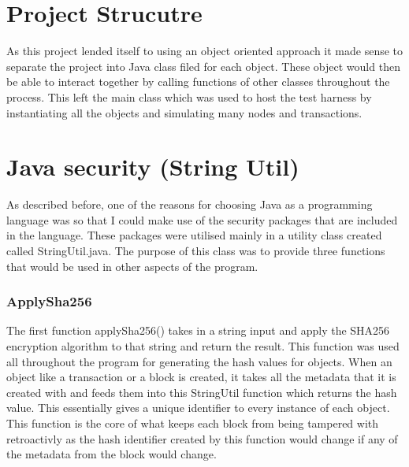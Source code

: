 \documentclass{l4proj}
\begin{document}
\section{Project Strucutre}
As this project lended itself to using an object oriented approach it made sense to separate the project into
Java class filed for each object. These object would then be able to interact together by calling functions
of other classes throughout the process. This left the main class which was used to host the test harness by
instantiating all the objects and simulating many nodes and transactions.


\section{Java security (String Util)}
As described before, one of the reasons for choosing Java as a programming language was so that I could make use
of the security packages that are included in the language. These packages were utilised mainly in a utility class created
called StringUtil.java. The purpose of this class was to provide three functions that would be used in other aspects
of the program. 
\subsubsection{ApplySha256}
The first function applySha256() takes in a string input and apply the SHA256 encryption
algorithm to that string and return the result. This function was used all throughout the program for generating
the hash values for objects. When an object like a transaction or a block is created, it takes all the metadata that
it is created with and feeds them into this StringUtil function which returns the hash value. This essentially gives
a unique identifier to every instance of each object. This function is the core of what keeps each block from being
tampered with retroactivly as the hash identifier created by this function would change if any of the metadata from
the block would change.

\end{document}
